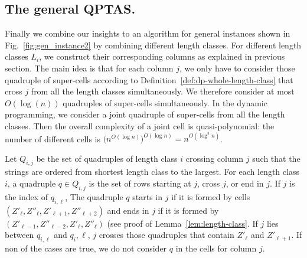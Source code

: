 \subsection{The general QPTAS.}\label{sec:generalQPTAS}
Finally we combine our insights to an algorithm for general instances shown in Fig.~\ref{fig:gen_instance2} by combining different length classes.
%
For different length classes $L_i$, we construct their corresponding columns as explained in previous section. 
The main idea is that for each column $j$, we only have to consider those quadruple of super-cells according to Definition~\ref{def:dp-whole-length-class} that cross $j$ from all the length classes simultaneously.
We therefore consider at most $O(\log(n))$ quadruples of super-cells simultaneously. In the dynamic programming, we consider a joint quadruple of super-cells from all the length classes.
Then the overall complexity of a joint cell is quasi-polynomial: the number of different cells is $\bigl(n^{O(\log n)}\bigr)^{O(\log n)} = n^{O(\log^2 n)}$.

Let $Q_{i,j}$ be the set of quadruples of length class $i$ crossing column $j$ such that the strings are ordered from shortest length class to the largest.
For each length class $i$, a quadruple $q \in Q_{i,j}$ is the set of rows starting at $j$, cross $j$, or end in $j$.
If $j$ is the index of $q_{i,\ell}$,
The quadruple $q$ starts in $j$ if it is formed by cells $(Z'_\ell,Z''_\ell,Z'_{\ell+1},Z''_{\ell+2})$ and ends in $j$ if it is formed by $(Z'_{\ell-1},Z''_{\ell-2},Z'_\ell,Z''_\ell)$ (see proof of Lemma~\ref{lem:length-class}. 
If $j$ lies between $q_{i,\ell}$ and $q_i,\ell$, $j$ crosses those quadruples that contain $Z'_\ell$ and $Z'_{\ell+1}$.
If non of the cases are true, we do not consider $q$ in the cells for column $j$.

